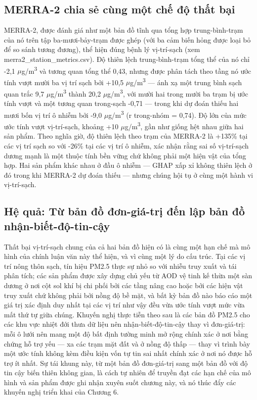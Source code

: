 \subsection{MERRA-2 chia sẻ cùng một chế độ thất bại}
MERRA-2, được đánh giá như một bản đồ tĩnh qua tổng hợp trung-bình-trạm của nó trên tập ba-mươi-bảy-trạm được ghép (với ba cảm biến hỏng được loại bỏ để so sánh tương đương), thể hiện đúng bệnh lý vị-trí-sạch (xem merra2\_station\_metrics.csv). Độ thiên lệch trung-bình-trạm tổng thể của nó chỉ -2,1 $\mu$g/m\textsuperscript{3} và tương quan tổng thể 0,43, nhưng được phân tách theo tầng nó ước tính vượt mười ba vị trí sạch bởi +10,5 $\mu$g/m\textsuperscript{3} --- ánh xạ một trung bình sạch quan trắc 9,7 $\mu$g/m\textsuperscript{3} thành 20,2 $\mu$g/m\textsuperscript{3}, với mười hai trong mười ba trạm bị ước tính vượt và một tương quan trong-sạch -0,71 --- trong khi dự đoán thiếu hai mươi bốn vị trí ô nhiễm bởi -9,0 $\mu$g/m\textsuperscript{3} (r trong-nhóm = 0,74). Độ lớn của mức ước tính vượt vị-trí-sạch, khoảng +10 $\mu$g/m\textsuperscript{3}, gần như giống hệt nhau giữa hai sản phẩm. Theo nghĩa giờ, độ thiên lệch theo trạm của MERRA-2 là +135\% tại các vị trí sạch so với -26\% tại các vị trí ô nhiễm, xác nhận rằng sai số vị-trí-sạch dương mạnh là một thuộc tính bền vững chứ không phải một hiện vật của tổng hợp. Hai sản phẩm khác nhau ở đầu ô nhiễm --- GHAP xấp xỉ không thiên lệch ở đó trong khi MERRA-2 dự đoán thiếu --- nhưng chúng hội tụ ở cùng một hành vi vị-trí-sạch.
\subsection{Hệ quả: Từ bản đồ đơn-giá-trị đến lập bản đồ nhận-biết-độ-tin-cậy}
Thất bại vị-trí-sạch chung của cả hai bản đồ hiện có là cùng một hạn chế mà mô hình của chính luận văn này thể hiện, và vì cùng một lý do cấu trúc. Tại các vị trí nông thôn sạch, tín hiệu PM2.5 thực sự nhỏ so với nhiễu truy xuất và tái phân tích; các sản phẩm được xây dựng chủ yếu từ AOD vệ tinh kế thừa một sàn dương ở nơi cột sol khí bị chi phối bởi các tầng nâng cao hoặc bởi các hiện vật truy xuất chứ không phải bởi nồng độ bề mặt, và bất kỳ bản đồ nào báo cáo một giá trị xác định duy nhất tại các vị trí như vậy đều vừa ước tính vượt mức vừa mất thứ tự giữa chúng. Khuyến nghị thực tiễn theo sau là các bản đồ PM2.5 cho các khu vực nhiệt đới thưa dữ liệu nên nhận-biết-độ-tin-cậy thay vì đơn-giá-trị: mỗi ô lưới nên mang một độ bất định tường minh mở rộng chính xác ở nơi bằng chứng hỗ trợ yếu --- xa các trạm mặt đất và ở nồng độ thấp --- thay vì trình bày một ước tính không kèm điều kiện vốn tự tin sai nhất chính xác ở nơi nó được hỗ trợ ít nhất. Sự tái khung này, từ một bản đồ đơn-giá-trị sang một bản đồ với độ tin cậy biến thiên không gian, là cách tự nhiên để truyền đạt các hạn chế của mô hình và sản phẩm được ghi nhận xuyên suốt chương này, và nó thúc đẩy các khuyến nghị triển khai của Chương 6.
